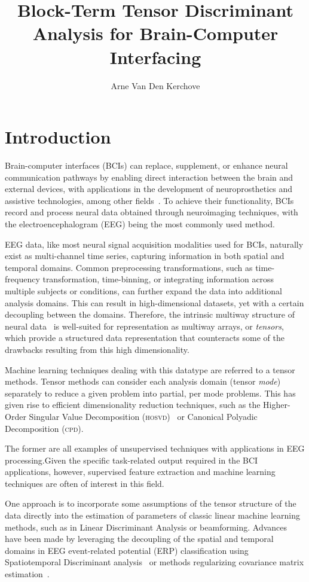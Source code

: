 \documentclass[twocolumn]{article}
\title{Block-Term Tensor Discriminant Analysis for Brain-Computer Interfacing}
\author{Arne Van Den Kerchove}
\begin{document}
\maketitle

\section{Introduction}
Brain-computer interfaces (BCIs) can replace, supplement, or enhance neural
communication pathways by enabling direct interaction between the brain and
external devices, with applications in the development of neuroprosthetics and
assistive technologies, among other fields~\cite{NicolasAlonso2012}.
To achieve their functionality, BCIs record and process neural data obtained
through neuroimaging techniques, with the electroencephalogram (EEG) being the
most commonly used method.

EEG data, like most neural signal acquisition modalities used for BCIs,
naturally exist as multi-channel time series, capturing information in both
spatial and temporal domains.
Common preprocessing transformations, such as time-frequency transformation,
time-binning, or integrating information across multiple subjects or conditions,
can further expand the data into additional analysis domains.
This can result in high-dimensional datasets, yet with a certain decoupling
between the domains.
Therefore, the intrinsic multiway structure of neural data~\cite{Erol2022} is
well-suited for representation as multiway arrays, or \emph{tensors}, which
provide a structured data representation that counteracts some of the drawbacks
resulting from this high dimensionality.

Machine learning techniques dealing with this datatype are referred to a tensor
methods.
Tensor methods can consider each analysis domain (tensor \emph{mode}) separately to
reduce a given problem into partial, per mode problems.
This has given rise to efficient dimensionality reduction techniques, such as
the Higher-Order Singular Value Decomposition
(\textsc{hosvd})~\cite{DeLathauwer2000} or Canonical Polyadic Decomposition
(\textsc{cpd}).

The former are all examples of unsupervised techniques with applications in EEG
processing.Given the specific task-related output required in the BCI applications, however,
supervised feature extraction and machine learning techniques are often of
interest in this field.

One approach is to incorporate some assumptions of the tensor structure of the
data directly into the estimation of parameters of classic linear machine
learning methods, such as in Linear Discriminant Analysis or beamforming.
Advances have been made by leveraging the decoupling of the spatial and temporal
domains in EEG event-related potential (ERP) classification using Spatiotemporal
Discriminant analysis~\cite{Li2010,Zhang2013} or methods regularizing covariance
matrix estimation~\cite{Kerchove2022,Sosulski2022}.
\end{document}
